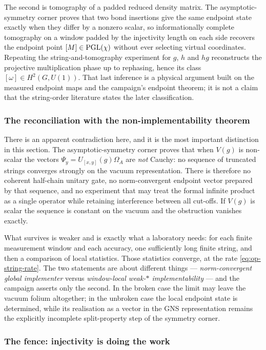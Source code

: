 The second is tomography of a padded reduced density matrix. The
asymptotic-symmetry corner proves that two bond insertions give the same
endpoint state exactly when they differ by a nonzero scalar, so
informationally complete tomography on a window padded by the injectivity
length on each side recovers the endpoint point $[M]\in\mathrm{PGL}(\chi)$ without
ever selecting virtual coordinates. Repeating the string-and-tomography
experiment for $g$, $h$ and $hg$ reconstructs the projective multiplication
phase up to rephasing, hence its class $[\omega]\in H^2(G,U(1))$. That last
inference is a physical argument built on the measured endpoint maps and the
campaign's endpoint theorem; it is not a claim that the string-order
literature states the later classification.

\subsubsection*{The reconciliation with the non-implementability theorem}

There is an apparent contradiction here, and it is the most important
distinction in this section. The asymptotic-symmetry corner proves that when
$V(g)$ is non-scalar the vectors $\Psi_y=U_{[x,y]}(g)\Omega_A$ are \emph{not}
Cauchy: no sequence of truncated strings converges strongly on the vacuum
representation. There is therefore no coherent half-chain unitary gate, no
norm-convergent endpoint vector prepared by that sequence, and no experiment
that may treat the formal infinite product as a single operator while
retaining interference between all cut-offs. If $V(g)$ is scalar the sequence
is constant on the vacuum and the obstruction vanishes exactly.

What survives is weaker and is exactly what a laboratory needs: for each finite
measurement window and each accuracy, one sufficiently long finite string, and
then a comparison of local statistics. Those statistics converge, at the rate
\eqref{eq:op-string-rate}. The two statements are about different things ---
\emph{norm-convergent global implementer} versus \emph{window-local weak-$*$
implementability} --- and the campaign asserts only the second. In the broken
case the limit may leave the vacuum folium altogether; in the unbroken case the
local endpoint state is determined, while its realisation as a vector in the
GNS representation remains the explicitly incomplete split-property step of the
symmetry corner.

\subsubsection*{The fence: injectivity is doing the work}

